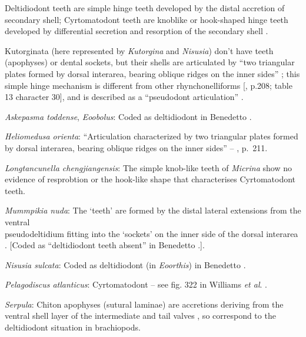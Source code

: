\documentclass[openany]{book}
\theoremstyle{definition}
\theoremstyle{definition}
\theoremstyle{definition}
\theoremstyle{remark}
\begin{document}
Deltidiodont teeth are simple hinge teeth developed by the distal
accretion of secondary shell; Cyrtomatodont teeth are knoblike or
hook-shaped hinge teeth developed by differential secretion and
resorption of the secondary shell \citep[fig. 322
in][]{Williams1997Introduction}.

Kutorginata (here represented by \emph{Kutorgina} and \emph{Nisusia})
don't have teeth (apophyses) or dental sockets, but their shells are
articulated by ``two triangular plates formed by dorsal interarea,
bearing oblique ridges on the inner sides''
\citep[p.~211]{Williams2000LinguliformeaCraniiformea}; this simple hinge
mechanism is different from other rhynchonelliforms
{[}\citet{Williams2000LinguliformeaCraniiformea}, p.208; table 13
character 30{]}, and is described as a ``pseudodont articulation''
\citep{Holmer2018Evolutionarysignificance}.

\hypertarget{Askepasma_toddense-coding-67}{}
\emph{Askepasma toddense}, \emph{Eoobolus}: Coded as deltidiodont in
Benedetto \citeyearpar{Benedetto2009iChaniella}.

\hypertarget{Heliomedusa_orienta-coding-67}{}
\emph{Heliomedusa orienta}: ``Articulation characterized by two
triangular plates formed by dorsal interarea, bearing oblique ridges on
the inner sides'' -- \citet{Williams2000LinguliformeaCraniiformea},
p.~211.

\hypertarget{Longtancunella_chengjiangensis-coding-67}{}
\emph{Longtancunella chengjiangensis}: The simple knob-like teeth of
\emph{Micrina} show no evidence of resprobtion or the hook-like shape
that characterises Cyrtomatodont teeth.

\hypertarget{Mummpikia_nuda-coding-67}{}
\emph{Mummpikia nuda}: The `teeth' are formed by the distal lateral
extensions from the ventral\\
pseudodeltidium fitting into the `sockets' on the inner side of the
dorsal interarea \citep{Holmer2018Evolutionarysignificance}. {[}Coded as
``deltidiodont teeth absent'' in Benedetto
\citeyearpar{Benedetto2009iChaniella}.{]}.

\hypertarget{Nisusia_sulcata-coding-67}{}
\emph{Nisusia sulcata}: Coded as deltidiodont (in \emph{Eoorthis}) in
Benedetto \citeyearpar{Benedetto2009iChaniella}.

\hypertarget{Pelagodiscus_atlanticus-coding-67}{}
\emph{Pelagodiscus atlanticus}: Cyrtomatodont -- see fig. 322 in
Williams \emph{et al}.
\citeyearpar{Williams2000LinguliformeaCraniiformea}.

\hypertarget{Serpula-coding-67}{}
\emph{Serpula}: Chiton apophyses (sutural laminae) are accretions
deriving from the ventral shell layer of the intermediate and tail
valves \citep{Schwabe2010}, so correspond to the deltidiodont situation
in brachiopods.
\end{document}
